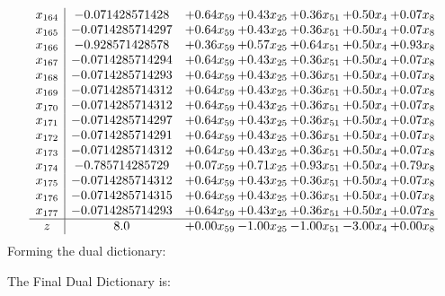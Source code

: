 \documentclass[8pt]{article}
\begin{document}
\[\begin{array}{c| c c@{\hskip 2pt} c@{\hskip 2pt} c@{\hskip 2pt} c@{\hskip 2pt} c@{\hskip 2pt} }
 x_{164}   &  -0.071428571428 & +  0.64 x_{59} & +  0.43 x_{25} & +  0.36 x_{51} & +  0.50 x_{4} & +  0.07 x_{8}\\
 x_{165}   &  -0.0714285714297 & +  0.64 x_{59} & +  0.43 x_{25} & +  0.36 x_{51} & +  0.50 x_{4} & +  0.07 x_{8}\\
 x_{166}   &  -0.928571428578 & +  0.36 x_{59} & +  0.57 x_{25} & +  0.64 x_{51} & +  0.50 x_{4} & +  0.93 x_{8}\\
 x_{167}   &  -0.0714285714294 & +  0.64 x_{59} & +  0.43 x_{25} & +  0.36 x_{51} & +  0.50 x_{4} & +  0.07 x_{8}\\
 x_{168}   &  -0.0714285714293 & +  0.64 x_{59} & +  0.43 x_{25} & +  0.36 x_{51} & +  0.50 x_{4} & +  0.07 x_{8}\\
 x_{169}   &  -0.0714285714312 & +  0.64 x_{59} & +  0.43 x_{25} & +  0.36 x_{51} & +  0.50 x_{4} & +  0.07 x_{8}\\
 x_{170}   &  -0.0714285714312 & +  0.64 x_{59} & +  0.43 x_{25} & +  0.36 x_{51} & +  0.50 x_{4} & +  0.07 x_{8}\\
 x_{171}   &  -0.0714285714297 & +  0.64 x_{59} & +  0.43 x_{25} & +  0.36 x_{51} & +  0.50 x_{4} & +  0.07 x_{8}\\
 x_{172}   &  -0.0714285714291 & +  0.64 x_{59} & +  0.43 x_{25} & +  0.36 x_{51} & +  0.50 x_{4} & +  0.07 x_{8}\\
 x_{173}   &  -0.0714285714312 & +  0.64 x_{59} & +  0.43 x_{25} & +  0.36 x_{51} & +  0.50 x_{4} & +  0.07 x_{8}\\
 x_{174}   &  -0.785714285729 & +  0.07 x_{59} & +  0.71 x_{25} & +  0.93 x_{51} & +  0.50 x_{4} & +  0.79 x_{8}\\
 x_{175}   &  -0.0714285714312 & +  0.64 x_{59} & +  0.43 x_{25} & +  0.36 x_{51} & +  0.50 x_{4} & +  0.07 x_{8}\\
 x_{176}   &  -0.0714285714315 & +  0.64 x_{59} & +  0.43 x_{25} & +  0.36 x_{51} & +  0.50 x_{4} & +  0.07 x_{8}\\
 x_{177}   &  -0.0714285714293 & +  0.64 x_{59} & +  0.43 x_{25} & +  0.36 x_{51} & +  0.50 x_{4} & +  0.07 x_{8}\\
\hline
z    &  8.0 & +  0.00 x_{59} & -1.00 x_{25} & -1.00 x_{51} & -3.00 x_{4} & +  0.00 x_{8}\\
\end{array}\]
Forming the dual dictionary:

The Final Dual Dictionary is: 
\end{document}
